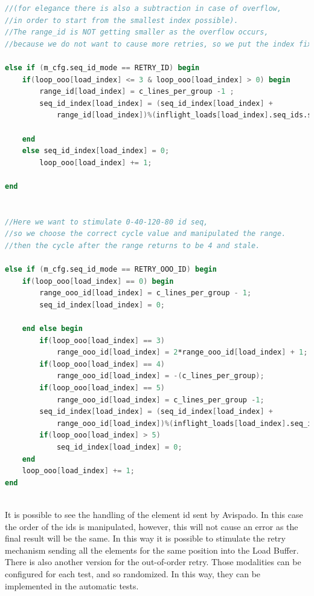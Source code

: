 \linespread{1}
\begin{lstlisting}[language=Verilog,style=verilog-style, backgroundcolor=\color{lyel_palette}, frame=tlb]
//(for elegance there is also a subtraction in case of overflow, 
//in order to start from the smallest index possible).
//The range_id is NOT getting smaller as the overflow occurs, 
//because we do not want to cause more retries, so we put the index fixed to 0

else if (m_cfg.seq_id_mode == RETRY_ID) begin
    if(loop_ooo[load_index] <= 3 & loop_ooo[load_index] > 0) begin
        range_id[load_index] = c_lines_per_group -1 ;
        seq_id_index[load_index] = (seq_id_index[load_index] +
            range_id[load_index])%(inflight_loads[load_index].seq_ids.size());
            
    end
    else seq_id_index[load_index] = 0;
        loop_ooo[load_index] += 1;
        
end


//Here we want to stimulate 0-40-120-80 id seq, 
//so we choose the correct cycle value and manipulated the range.
//then the cycle after the range returns to be 4 and stale.

else if (m_cfg.seq_id_mode == RETRY_OOO_ID) begin
    if(loop_ooo[load_index] == 0) begin
        range_ooo_id[load_index] = c_lines_per_group - 1;
        seq_id_index[load_index] = 0;

    end else begin
        if(loop_ooo[load_index] == 3) 
            range_ooo_id[load_index] = 2*range_ooo_id[load_index] + 1;
        if(loop_ooo[load_index] == 4) 
            range_ooo_id[load_index] = -(c_lines_per_group);
        if(loop_ooo[load_index] == 5) 
            range_ooo_id[load_index] = c_lines_per_group -1;
        seq_id_index[load_index] = (seq_id_index[load_index] +
            range_ooo_id[load_index])%(inflight_loads[load_index].seq_ids.size());
        if(loop_ooo[load_index] > 5) 
            seq_id_index[load_index] = 0;
    end
    loop_ooo[load_index] += 1;
end



\end{lstlisting}
\linespread{1.2}

It is possible to see the handling of the element id sent by Avispado. In this case the order of the ids is manipulated, however, this will not cause an error as the final result will be the same.
In this way it is possible to stimulate the retry mechanism sending all the elements for the same position into the Load Buffer. There is also another version for the out-of-order retry.
Those modalities can be configured for each test, and so randomized. In this way, they can be implemented in the automatic tests.


